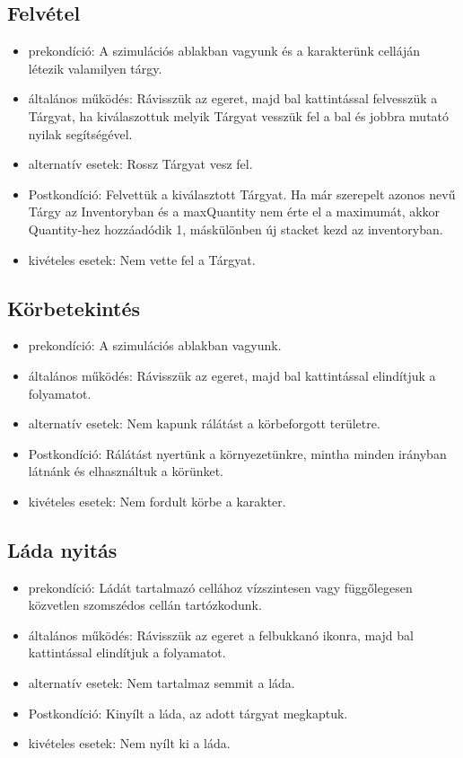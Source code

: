 \subsection{Felvétel}

\begin{itemize}
    \item prekondíció: A szimulációs ablakban vagyunk és a karakterünk celláján létezik valamilyen tárgy.
    \item általános működés: Rávisszük az egeret, majd bal kattintással felvesszük a Tárgyat, ha kiválaszottuk melyik Tárgyat vesszük fel a bal és jobbra mutató nyilak segítségével.
    \item alternatív esetek: Rossz Tárgyat vesz fel.
    \item Postkondíció: Felvettük a kiválasztott Tárgyat. Ha már szerepelt azonos nevű Tárgy az Inventoryban és a maxQuantity nem érte el a maximumát, akkor Quantity-hez hozzáadódik 1, máskülönben új stacket kezd az inventoryban.
    \item kivételes esetek: Nem vette fel a Tárgyat.
\end{itemize}

\subsection{Körbetekintés}

\begin{itemize}
    \item prekondíció: A szimulációs ablakban vagyunk.
    \item általános működés: Rávisszük az egeret, majd bal kattintással elindítjuk a folyamatot.
    \item alternatív esetek: Nem kapunk rálátást a körbeforgott területre.
    \item Postkondíció: Rálátást nyertünk a környezetünkre, mintha minden irányban látnánk és elhasználtuk a körünket.
    \item kivételes esetek: Nem fordult körbe a karakter.
\end{itemize}

\subsection{Láda nyitás}

\begin{itemize}
    \item prekondíció: Ládát tartalmazó cellához vízszintesen vagy függőlegesen közvetlen szomszédos cellán tartózkodunk.
    \item általános működés: Rávisszük az egeret a felbukkanó ikonra, majd bal kattintással elindítjuk a folyamatot.
    \item alternatív esetek: Nem tartalmaz semmit a láda.
    \item Postkondíció: Kinyílt a láda, az adott tárgyat megkaptuk.
    \item kivételes esetek: Nem nyílt ki a láda.
\end{itemize}

